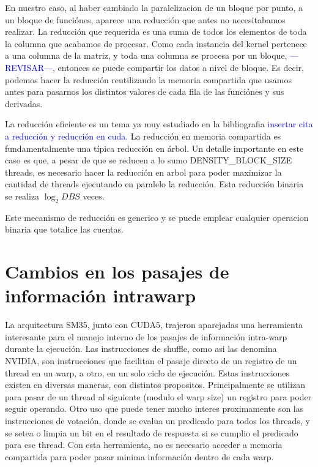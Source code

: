 En nuestro caso, al haber cambiado la paralelizacion de un bloque por punto, a un bloque
de funci\'ones, aparece una reducci\'on que antes no necesitabamos realizar. La reducci\'on que
requerida es una suma de todos los elementos de toda la columna que acabamos de procesar.
Como cada instancia del kernel pertenece a una columna de la matriz, y toda una columna se
procesa por un bloque, \textcolor{blue}{---REVISAR---}, entonces se puede compartir los datos
a nivel de bloque. Es decir, podemos hacer la reducci\'on reutilizando la memoria compartida
que usamos antes para pasarnos los distintos valores de cada fila de las funci\'ones y sus derivadas.

La reducci\'on eficiente es un tema ya muy estudiado en la bibliografia \textcolor{blue}{insertar cita a
reducci\'on y reducci\'on en cuda}. La reducci\'on en memoria compartida es fundamentalmente
una t\'ipica reducci\'on en \'arbol. Un detalle importante en este caso es que, a pesar de que
se reducen a lo sumo DENSITY\_BLOCK\_SIZE threads, es necesario hacer la reducci\'on en arbol
para poder maximizar la cantidad de threads ejecutando en paralelo la reducci\'on. Esta reducci\'on
binaria se realiza $\log_2{DBS}$ veces.

Este mecanismo de reducci\'on es generico y se puede emplear cualquier operacion binaria que
totalice las cuentas.


\section{Cambios en los pasajes de informaci\'on intrawarp}
La arquitectura SM35, junto con CUDA5, trajeron aparejadas una herramienta interesante
para el manejo interno de los pasajes de informaci\'on intra-warp durante la ejecuci\'on.
Las instrucciones de shuffle, como asi las denomina NVIDIA, son instrucciones que facilitan
el pasaje directo de un registro de un thread en un warp, a otro, en un solo ciclo de ejecuci\'on.
Estas instrucciones existen en diversas maneras, con distintos propositos. Principalmente se
utilizan para pasar de un thread al siguiente (modulo el warp size) un registro para poder seguir
operando. Otro uso que puede tener mucho interes proximamente son las instrucciones de votaci\'on,
donde se evalua un predicado para todos los threads, y se setea o limpia un bit en el resultado
de respuesta si se cumplio el predicado para ese thread. Con esta herramienta, no es necesario
acceder a memoria compartida para poder pasar minima informaci\'on dentro de cada warp.

